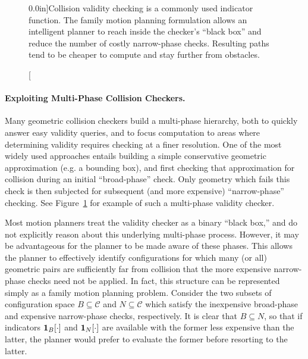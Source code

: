 \begin{figure}[t]
   \centering
   
   \quad%
   
   \caption[][0.0in]{Collision validity checking is a commonly used
     indicator function.
     The family motion planning formulation allows an intelligent
     planner to reach inside the checker's ``black box''
     and reduce the number of costly narrow-phase checks.
     Resulting paths tend to be cheaper to compute and
     stay further from obstacles.}
   \label{fig:broad-phase}
\end{figure}

\paragraph{Exploiting Multi-Phase Collision Checkers.}
Many geometric collision checkers build a multi-phase hierarchy,
both to quickly answer easy validity queries,
and to focus computation to areas where determining validity
requires checking at a finer resolution.
One of the most widely used approaches entails building
a simple conservative geometric approximation
(e.g. a bounding box),
and first checking that approximation for collision during an
initial ``broad-phase'' check.
Only geometry which fails this check is then subjected for
subsequent (and more expensive) ``narrow-phase'' checking.
See Figure~\ref{fig:broad-phase} for example of such a multi-phase
validity checker.

Most motion planners treat the validity checker as a binary
``black box,''
and do not explicitly reason about this underlying multi-phase process.
However,
it may be advantageous for the planner to be made aware of these
phases.
This allows the planner to effectively identify configurations for which
many (or all) geometric pairs are sufficiently far from collision
that the more expensive narrow-phase checks need not be applied.
In fact,
this structure can be represented simply as a family motion planning
problem.
Consider the two subsets of configuration space
$B \subseteq \mathcal{C}$ and $N \subseteq \mathcal{C}$
which satisfy the inexpensive broad-phase and expensive narrow-phase
checks, respectively.
It is clear that $B \subseteq N$,
so that if indicators ${\bf 1}_B[\cdot]$ and ${\bf 1}_N[\cdot]$
are available with the former less expensive than the latter,
the planner would prefer to evaluate the former before resorting to
the latter.

